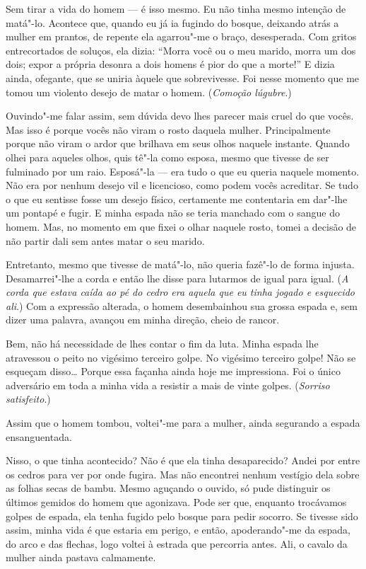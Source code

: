 Sem tirar a vida do homem --- é isso mesmo. Eu não tinha mesmo intenção de
matá"-lo. Acontece que, quando eu já ia fugindo do bosque, deixando
atrás a mulher em prantos, de repente ela agarrou"-me o braço,
desesperada. Com gritos entrecortados de soluços, ela dizia: ``Morra
você ou o meu marido, morra um dos dois; expor a própria desonra a dois
homens é pior do que a morte!'' E dizia ainda, ofegante, que se uniria
àquele que sobrevivesse. Foi nesse momento que me tomou  um violento
desejo de matar o homem. (\textit{Comoção lúgubre}.)

Ouvindo"-me falar assim, sem dúvida devo lhes parecer mais cruel do que
vocês. Mas isso é porque vocês não viram o rosto daquela mulher.
Principalmente porque não viram o ardor que brilhava em seus olhos
naquele instante. Quando olhei para aqueles olhos, quis tê"-la como
esposa, mesmo que tivesse de ser fulminado por um raio. Esposá"-la --- era
tudo o que eu queria naquele momento. Não era por nenhum desejo vil e
licencioso, como podem vocês acreditar. Se tudo o que eu sentisse fosse
um desejo físico, certamente me contentaria em dar"-lhe um pontapé e
fugir. E minha espada não se teria manchado com o sangue do homem. Mas,
no momento em que fixei o olhar naquele rosto, tomei a decisão de não
partir dali sem antes matar o seu marido.

Entretanto, mesmo que tivesse de matá"-lo, não queria fazê"-lo de forma injusta. 
Desamarrei"-lhe a corda e então lhe disse para lutarmos de igual para igual. 
(\textit{A corda que estava caída ao pé do cedro era aquela que eu tinha jogado e esquecido ali}.) 
Com a expressão alterada, o homem desembainhou sua grossa espada e, sem dizer uma palavra, 
avançou em minha direção, cheio de rancor.

Bem, não há necessidade de lhes contar o fim da luta. Minha espada lhe
atravessou o peito no vigésimo terceiro golpe. No vigésimo terceiro
golpe! Não se esqueçam disso\ldots{} Porque essa façanha ainda hoje me
impressiona. Foi o único adversário em toda a minha vida a resistir a
mais de vinte golpes. (\textit{Sorriso satisfeito}.)

Assim que o homem tombou, voltei"-me para a mulher, ainda segurando a
espada ensanguentada. 

Nisso, o que tinha acontecido? Não é que ela tinha desaparecido? 
Andei por entre os cedros para ver por onde fugira. Mas
não encontrei nenhum vestígio dela sobre as folhas secas de bambu. Mesmo
aguçando o ouvido, só pude distinguir os últimos gemidos do homem que
agonizava. Pode ser que, enquanto trocávamos golpes de espada, ela
tenha fugido pelo bosque para pedir socorro. Se tivesse sido assim,
minha vida é que estaria em perigo, e então, apoderando"-me da espada,
do arco e das flechas, logo voltei à estrada que percorria antes. Ali,
o cavalo da mulher ainda pastava calmamente.

